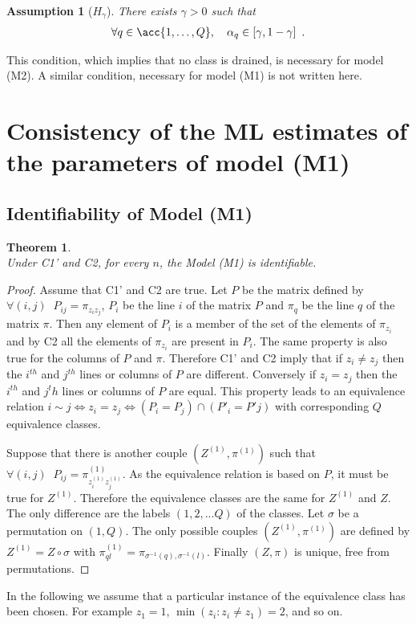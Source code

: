 \documentclass[11pt]{article}
\newtheorem{thm}{Theorem}[section]
\newtheorem{proof}{Proof}%
\newtheorem{assum}{Assumption}
\begin{document}
\begin{assum}[$H_{\gamma}$]
\label{assum.alpha.trunc}
There exists $\gamma >0$ such that
\begin{align*}
        \forall q \in \acc{1,\ldots,Q},\quad \alpha_q\in [\gamma,1-\gamma]\enspace.
\end{align*}

\end{assum}
This condition, which implies that no class is drained, is necessary for model (M2). A similar condition, necessary for model (M1) is not written here.


\section{Consistency of the ML estimates of the parameters of model (M1)}
\label{sec.consistency.M1}










\subsection{Identifiability of  Model (M1)}

\begin{thm}\label{thm.identif.M1}
\
\\
Under C1' and C2, for every $n$, the Model (M1)   is identifiable.
\end{thm}


\begin{proof}
Assume that C1' and C2 are true.
Let $P$ be the matrix defined by
$\forall (i,j) \; \; P_{ij}= \pi_{z_i z_j}$, $P_i$
be the line $i$ of the matrix $P$ and $\pi_q$
be the line $q$ of the matrix $\pi$.
%
Then any element of $P_i$ is a member of the
set of the elements of $\pi_{z_i}$ and by C2 all
the elements of $\pi_{z_i}$  are present in $P_i$.
%
The same property is also true for the columns of $P$ and $\pi$.
Therefore C1' and C2 imply that if $z_i \neq z_j$ then the $i^{th}$
 and $j^{th}$ lines or columns of $P$ are different.
%
Conversely if $z_i = z_j$ then the $i^{th}$ and $j^th$ lines
 or columns of $P$ are equal. This property leads to an equivalence
relation
$i \sim j \Leftrightarrow z_i=z_j \Leftrightarrow (P_i=P_j) \cap  (P'_i=P'j)$
with corresponding $Q$ equivalence classes.

Suppose that there is another
couple $(Z^{(1)},\pi^{(1)})$ such that
$\forall (i,j) \; \; P_{ij}= \pi^{(1)}_{z^{(1)}_i z^{(1)}_j}$.
As the equivalence relation is based on $P$, it must be true for $Z^{(1)}$.
%
Therefore the equivalence classes are the same for $Z^{(1)}$ and $Z$.
The only difference are the labels $(1,2,...Q)$ of the classes.
%
Let $\sigma$ be a permutation on $(1,Q)$.
The only possible couples $(Z^{(1)},\pi^{(1)})$ are defined by
$Z^{(1)}=Z \circ \sigma$ with $\pi^{(1)}_{ql}=\pi_{\sigma^{-1}(q),\sigma^{-1}(l)}$. %
Finally $(Z,\pi)$ is unique, free from permutations.    
\end{proof}
In the following we assume that a particular instance of the equivalence class has been chosen. For example $z_1=1$, $\min(z_i : z_i \neq z_1)=2$, and so on.
\end{document}
